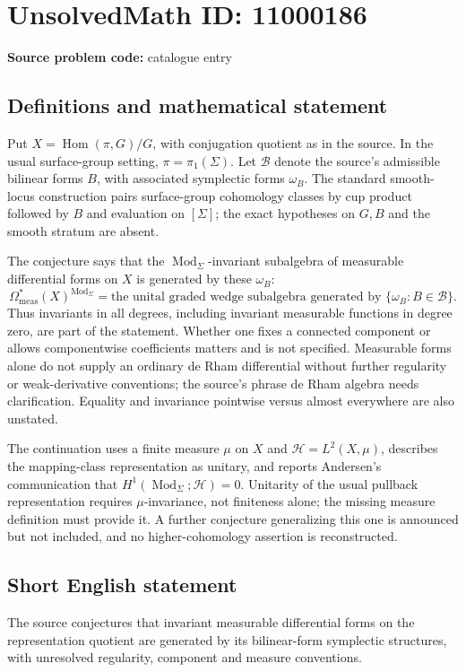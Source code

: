 \documentclass[11pt]{article}
\begin{document}
\section*{UnsolvedMath ID: 11000186}
\textbf{Source problem code:} catalogue entry
\subsection{Definitions and mathematical statement}
Put \(X=\operatorname{Hom}(\pi,G)/G\), with conjugation quotient as in the source. In the usual surface-group setting, \(\pi=\pi_1(\Sigma)\). Let \(\mathscr B\) denote the source's admissible bilinear forms \(B\), with associated symplectic forms \(\omega_B\). The standard smooth-locus construction pairs surface-group cohomology classes by cup product followed by \(B\) and evaluation on \([\Sigma]\); the exact hypotheses on \(G,B\) and the smooth stratum are absent.

The conjecture says that the \(\operatorname{Mod}_\Sigma\)-invariant subalgebra of measurable differential forms on \(X\) is generated by these \(\omega_B\):
\[
 \Omega^*_{\mathrm{meas}}(X)^{\operatorname{Mod}_\Sigma}
   =\text{the unital graded wedge subalgebra generated by }
          \{\omega_B:B\in\mathscr B\}.
\]
Thus invariants in all degrees, including invariant measurable functions in degree zero, are part of the statement. Whether one fixes a connected component or allows componentwise coefficients matters and is not specified. Measurable forms alone do not supply an ordinary de Rham differential without further regularity or weak-derivative conventions; the source's phrase de Rham algebra needs clarification. Equality and invariance pointwise versus almost everywhere are also unstated.

The continuation uses a finite measure \(\mu\) on \(X\) and \(\mathcal H=L^2(X,\mu)\), describes the mapping-class representation as unitary, and reports Andersen's communication that \(H^1(\operatorname{Mod}_\Sigma;\mathcal H)=0\). Unitarity of the usual pullback representation requires \(\mu\)-invariance, not finiteness alone; the missing measure definition must provide it. A further conjecture generalizing this one is announced but not included, and no higher-cohomology assertion is reconstructed.
\subsection{Short English statement}
The source conjectures that invariant measurable differential forms on the representation quotient are generated by its bilinear-form symplectic structures, with unresolved regularity, component and measure conventions.
\end{document}
